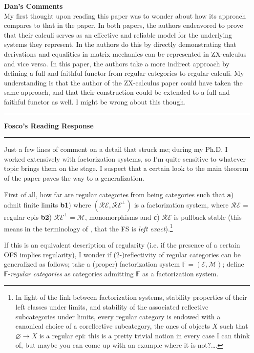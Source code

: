 \documentclass{amsart}
\newcommand{\iam}[1]{
  \vspace{0.25em}
  \hrule
  \vspace{0.25em}
  \textbf{{#1}'s Reading Response}
  \vspace{0.25em}
  \hrule
  \vspace{1em}
}
\begin{document}
\textbf{Dan's Comments}\\
My first thought upon reading this paper was to wonder about how its approach compares to that in the \cite{zxcomplete} paper. In both papers, the authors endeavored to prove that their calculi serves as an effective and reliable model for the underlying systems they represent. In \cite{zxcomplete} the authors do this by directly demonstrating that derivations and equalities in matrix mechanics can be represented in ZX-calculus and vice versa. In this paper, the authors take a more indirect approach by defining a full and faithful functor from regular categories to regular calculi. My understanding is that the author of the ZX-calculus paper could have taken the same approach, and that their construction could be extended to a full and faithful functor as well. I might be wrong about this though.


\iam{Fosco} Just a few lines of comment on a detail that struck me; during my Ph.D. I worked extensively with factorization systems, so I'm quite sensitive to whatever topic brings them on the stage. I suspect that a certain look to the main theorem of the paper paves the way to a generalization.

First of all, how far are regular categories from being categories such that \textbf{a}) admit finite limits \textbf{b1}) where $(\mathcal{RE}, \mathcal{RE}^\perp)$ is a factorization system, where $\mathcal{RE}$ = regular epis \textbf{b2}) $\mathcal{RE}^\perp = \mathcal M$, monomorphisms and \textbf{c}) $\mathcal{RE}$ is pullback-stable (this means in the terminology of \cite{}, that the FS is \emph{left exact}).\footnote{In light of the link between factorization systems, stability properties of their left classes under limits, and stability of the associated reflective subcategories under limits, every regular category is endowed with a canonical choice of a coreflective subcategory, the ones of objects $X$ such that $\varnothing \to X$ is a regular epi: this is a pretty trivial notion in every case I can think of, but maybe you can come up with an example where it is not?\dots.}

If this is an equivalent description of regularity (i.e. if the presence of a certain OFS implies regularity), I wonder if (2-)reflectivity of regular categories can be generalized as follows; take a (proper) factorization system $\mathbb F = (\mathcal E, \mathcal M)$; define $\mathbb F$-\emph{regular categories} as categories admitting $\mathbb F$ as a factorization system.
\end{document}

